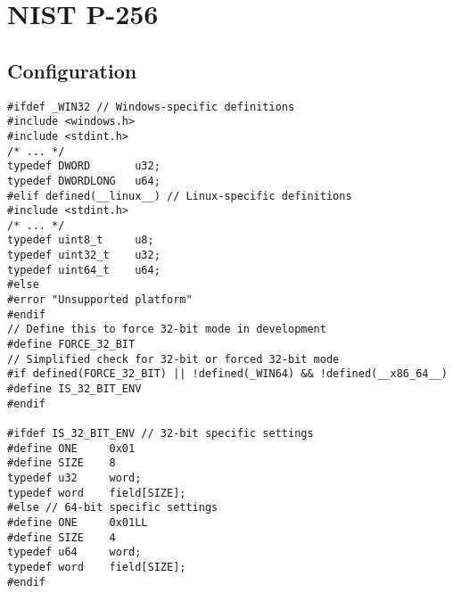 \chapter{NIST P-256}
\iffalse
\section{Time Measure in Linux}

\begin{lstlisting}[style=C]
#define _POSIX_C_SOURCE 200809L
#include <time.h>

typedef int8_t i8;
typedef int32_t i32;
typedef int64_t i64;

typedef uint8_t u8;
typedef uint32_t u32;
typedef uint64_t u64;

inline u64 rdtsc(void) {
	u32 lo, hi;
	
	__asm__ __volatile__ (
	"rdtsc" : "=a" (lo), "=d" (hi)
	);
	
	return ((u64)hi << 32) | lo;
}

u64 measure_cycle(void (*func)(u8*, u8*), u8* para1, u8* para2) {
	u64 start, end;
	const u64 num_runs = 10000;
	
	func(para1, para2);
	start = rdtsc();
	for (i32 i = 0; i < num_runs; i++)
		func(para1, para2);
	end = rdtsc();
	
	return (end - start) / num_runs;
}

double measure_time(void (*func)(u8*, u8*), u8* para1, u8* para2) {
	struct timespec start, end;
	double cpu_time_used;
	const double num_runs = 10000;
	
	func(para1, para2);
	clock_gettime(CLOCK_MONOTONIC, &start);
	for (i32 i = 0; i < num_runs; i++)
		func(para1, para2);
	clock_gettime(CLOCK_MONOTONIC, &end);
	
	cpu_time_used =
		(end.tv_sec - start.tv_sec) +
		(end.tv_nsec - start.tv_nsec) / 1e9;
	
	return cpu_time_used / num_runs;
}
\end{lstlisting}
\fi

\section*{Configuration}
\begin{lstlisting}[style=C]
#ifdef _WIN32 // Windows-specific definitions
#include <windows.h>
#include <stdint.h>
/* ... */
typedef DWORD       u32;
typedef DWORDLONG   u64;
#elif defined(__linux__) // Linux-specific definitions
#include <stdint.h>
/* ... */
typedef uint8_t     u8;
typedef uint32_t    u32;
typedef uint64_t    u64;
#else
#error "Unsupported platform"
#endif
// Define this to force 32-bit mode in development
#define FORCE_32_BIT
// Simplified check for 32-bit or forced 32-bit mode
#if defined(FORCE_32_BIT) || !defined(_WIN64) && !defined(__x86_64__)
#define IS_32_BIT_ENV
#endif

#ifdef IS_32_BIT_ENV // 32-bit specific settings
#define ONE     0x01
#define SIZE    8
typedef u32     word;
typedef word    field[SIZE];
#else // 64-bit specific settings
#define ONE     0x01LL
#define SIZE    4
typedef u64     word;
typedef word    field[SIZE];
#endif
\end{lstlisting}

